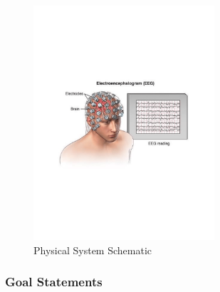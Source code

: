 \documentclass[12pt]{article}
\begin{document}
\begin{figure}[h!]
\begin{center}
 \includegraphics[width=0.6\textwidth]{EEG-recording}
\caption{Physical System Schematic}
\label{Fig_PhysicalSystem}
\end{center}
\end{figure}


\newpage

\subsubsection{Goal Statements}

\end{document}
